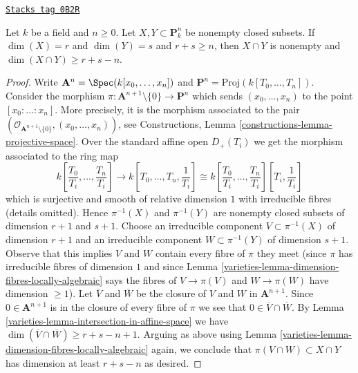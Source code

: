 \begin{lemma}
\label{varieties-lemma-intersection-in-projective-space}
\href{https://stacks.math.columbia.edu/tag/0B2R}{\texttt{Stacks tag 0B2R}}

Let $k$ be a field and $n \geq 0$. Let $X, Y \subset \mathbf{P}^n_k$
be nonempty closed subsets. If $\dim(X) = r$ and $\dim(Y) = s$ and
$r + s \geq n$, then $X \cap Y$ is nonempty and
$\dim(X \cap Y) \geq r + s - n$.
\end{lemma}

\begin{proof}

Write $\mathbf{A}^n = \Spec(k[x_0, \ldots, x_n])$ and
$\mathbf{P}^n = \text{Proj}(k[T_0, \ldots, T_n])$.
Consider the morphism
$\pi : \mathbf{A}^{n + 1} \setminus \{0\} \to \mathbf{P}^n$
which sends $(x_0, \ldots, x_n)$ to the point $[x_0 : \ldots : x_n]$.
More precisely, it is the morphism associated to the pair
$(\mathcal{O}_{\mathbf{A}^{n + 1} \setminus \{0\}}, (x_0, \ldots, x_n))$,
see Constructions, Lemma \ref{constructions-lemma-projective-space}.
Over the standard affine open $D_+(T_i)$ we get the morphism
associated to the ring map
$$
k\left[\frac{T_0}{T_i}, \ldots, \frac{T_n}{T_i}\right]
\longrightarrow
k\left[T_0, \ldots, T_n, \frac{1}{T_i}\right] \cong
k\left[\frac{T_0}{T_i}, \ldots, \frac{T_n}{T_i}\right]
\left[T_i, \frac{1}{T_i}\right]
$$
which is surjective and smooth of relative dimension $1$
with irreducible fibres (details omitted).
Hence $\pi^{-1}(X)$ and $\pi^{-1}(Y)$ are nonempty closed subsets of
dimension $r + 1$ and $s + 1$. Choose an irreducible component
$V \subset \pi^{-1}(X)$ of dimension $r + 1$ and an
irreducible component $W \subset \pi^{-1}(Y)$ of dimension $s + 1$.
Observe that this implies $V$ and $W$ contain every fibre of $\pi$
they meet (since $\pi$ has irreducible fibres of dimension $1$
and since Lemma \ref{varieties-lemma-dimension-fibres-locally-algebraic}
says the fibres of $V \to \pi(V)$ and $W \to \pi(W)$ have dimension $\geq 1$).
Let $\overline{V}$ and $\overline{W}$ be the closure of
$V$ and $W$ in $\mathbf{A}^{n + 1}$. Since $0 \in \mathbf{A}^{n + 1}$
is in the closure of every fibre of $\pi$ we see that
$0 \in \overline{V} \cap \overline{W}$. By
Lemma \ref{varieties-lemma-intersection-in-affine-space}
we have $\dim(\overline{V} \cap \overline{W}) \geq r + s - n + 1$.
Arguing as above using Lemma \ref{varieties-lemma-dimension-fibres-locally-algebraic}
again, we conclude that $\pi(V \cap W) \subset X \cap Y$
has dimension at least $r + s - n$ as desired.
\end{proof}

